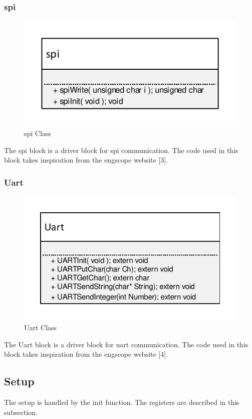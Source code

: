 \subsubsection{spi}
\begin{figure}[H]
\centering
\includegraphics[scale=0.9]{billeder/CDUspiClass}
\caption{spi Class}
\label{fig:cduspiclass}
\end{figure}
The spi block is a driver block for spi communication. The code used in this block takes inspiration from the engscope website [3].
\subsubsection{Uart}
\begin{figure}[H]
\centering
\includegraphics[scale=0.9]{billeder/CDUUartClass}
\caption{Uart Class}
\label{fig:cduuartclass}
\end{figure}
The Uart block is a driver block for uart communication. The code used in this block takes inspiration from the engscope website [4].

\subsection{Setup}
The setup is handled by the init function. The registers are described in this subsection.
